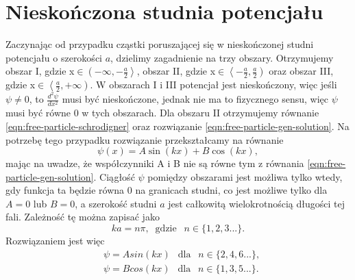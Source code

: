 \documentclass{SGGW-thesis}
\begin{document}
	\section{Nieskończona studnia potencjału}
	Zaczynając od przypadku cząstki poruszającej się w nieskończonej studni potencjału o szerokości $a$, dzielimy zagadnienie na trzy obszary. Otrzymujemy obszar I, gdzie x$\in\left(-\infty,-\frac{a}{2}\right>$, obszar II, gdzie x$\in\left<-\frac{a}{2}, \frac{a}{2}\right)$ oraz obszar III, gdzie x$\in\left<\frac{a}{2}, +\infty\right)$. W obszarach I i III potencjał jest nieskończony, więc jeśli $\psi\neq0$, to $\frac{d^2\psi}{dx^2}$ musi być nieskończone, jednak nie ma to fizycznego sensu, więc $\psi$ musi być równe 0 w tych obszarach. Dla obszaru II otrzymujemy równanie \ref{eqn:free-particle-schrodigner} oraz rozwiązanie \ref{eqn:free-particle-gen-solution}. Na potrzebę tego przypadku rozwiązanie przekształcamy na równanie
	\begin{equation}
	\psi(x) = A\sin(kx) + B\cos(kx),
	\end{equation}
mając na uwadze, że współczynniki A i B nie są równe tym z równania \ref{eqn:free-particle-gen-solution}. Ciągłość $\psi$ pomiędzy obszarami jest możliwa tylko wtedy, gdy funkcja ta będzie równa 0 na granicach studni, co jest możliwe tylko dla $A=0$ lub $B=0$, a szerokość studni $a$ jest całkowitą wielokrotnością długości tej fali. Zależność tę można zapisać jako
	\begin{equation}\label{eqn:discrete-well}
	ka=n\pi, \;\;\textrm{gdzie}\;\;\ n\in\{1, 2, 3...\}.
	\end{equation}
Rozwiązaniem jest więc
	\begin{equation}\label{eqn:well-inside-sol}
	\begin{split}
		&\psi = Asin(kx) \;\;\ \textrm{dla} \;\;\ n\in\{2, 4, 6...\}, \\
		&\psi = Bcos(kx) \;\;\ \textrm{dla} \;\;\ n\in\{1, 3, 5...\}.
	\end{split}
	\end{equation}
\end{document}

